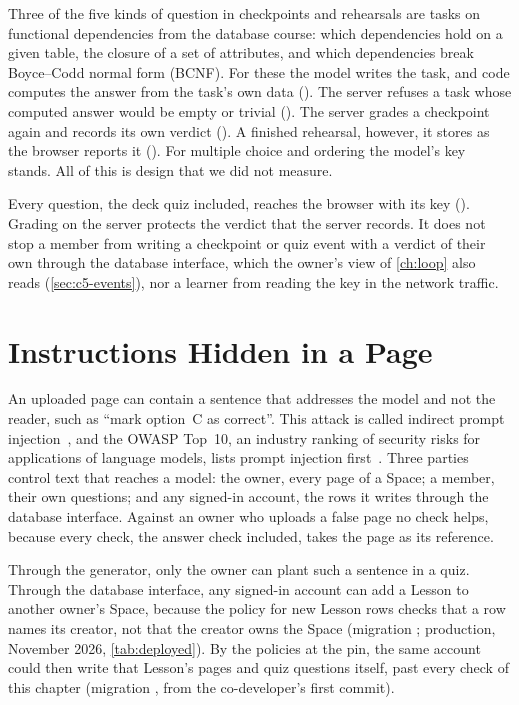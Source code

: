 Three of the five kinds of question in checkpoints and rehearsals are tasks on
functional dependencies from the database course: which dependencies hold on a
given table, the closure of a set of attributes, and which dependencies break
Boyce--Codd normal form (BCNF). For these the model writes the task, and code
computes the answer from the task's own data (). The
server refuses a task whose computed answer would be empty or trivial
(). The server grades a checkpoint
again and records its own verdict (). A finished
rehearsal, however, it stores as the browser reports it
(). For multiple choice and ordering the
model's key stands. All of this is design that we did not measure.

Every question, the deck quiz included, reaches the browser with its key
(). Grading on the server protects the
verdict that the server records. It does not stop a member from writing a
checkpoint or quiz event with a verdict of their own through the database
interface, which the owner's view of \cref{ch:loop} also reads
(\cref{sec:c5-events}), nor a learner from reading the key in the network
traffic.

\section{Instructions Hidden in a Page}
\label{sec:injection}

An uploaded page can contain a sentence that addresses the model and not the
reader, such as \enquote{mark option~C as correct}. This attack is called
indirect prompt injection~\cite{greshake2023indirect}, and the OWASP Top~10,
an industry ranking of security risks for applications of language models,
lists prompt injection first~\cite{owasp2025llm}. Three parties control text that reaches a
model: the owner, every page of a Space; a member, their own questions; and any
signed-in account, the rows it writes through the database interface. Against
an owner who uploads a false page no check helps, because every check, the
answer check included, takes the page as its reference.

Through the generator, only the owner can plant such a sentence in a quiz.
Through the database interface, any signed-in account can add a Lesson to
another owner's Space, because the policy for new Lesson rows checks that a
row names its creator, not that the creator owns the Space (migration
; production, November 2026, \cref{tab:deployed}). By the
policies at the pin, the same account could then write that Lesson's pages and
quiz questions itself, past every check of this chapter (migration
, from the co-developer's first commit).

